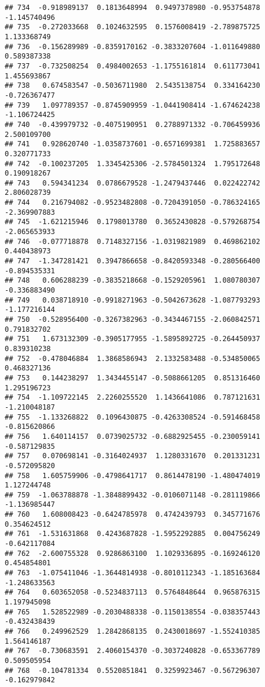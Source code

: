 \documentclass[
]{article}
\begin{document}
\begin{verbatim}
## 734  -0.918989137  0.1813648994  0.9497378980 -0.953754878 -1.145740496
## 735  -0.272033668  0.1024632595  0.1576008419 -2.789875725  1.133368749
## 736  -0.156289989 -0.8359170162 -0.3833207604 -1.011649880  0.589387338
## 737  -0.732508254  0.4984002653 -1.1755161814  0.611773041  1.455693867
## 738   0.674583547 -0.5036711980  2.5435138754  0.334164230 -0.726367477
## 739   1.097789357 -0.8745909959 -1.0441908414 -1.674624238 -1.106724425
## 740  -0.439979732 -0.4075190951  0.2788971332 -0.706459936  2.500109700
## 741   0.928620740 -1.0358737601 -0.6571699381  1.725883657  0.320771733
## 742  -0.100237205  1.3345425306 -2.5784501324  1.795172648  0.190918267
## 743   0.594341234  0.0786679528 -1.2479437446  0.022422742  2.806028739
## 744   0.216794082 -0.9523482808 -0.7204391050 -0.786324165 -2.369907883
## 745  -1.621215946  0.1798013780  0.3652430828 -0.579268754 -2.065653933
## 746  -0.077718878  0.7148327156 -1.0319821989  0.469862102  0.440438973
## 747  -1.347281421  0.3947866658 -0.8420593348 -0.280566400 -0.894535331
## 748   0.606288239 -0.3835218668 -0.1529205961  1.080780307 -0.336883490
## 749   0.038718910 -0.9918271963 -0.5042673628 -1.087793293 -1.177216144
## 750  -0.528956400 -0.3267382963 -0.3434467155 -2.060842571  0.791832702
## 751   1.673132309 -0.3905177955 -1.5895892725 -0.264450937  0.839310238
## 752  -0.478046884  1.3868586943  2.1332583488 -0.534850065  0.468327136
## 753   0.144238297  1.3434455147 -0.5088661205  0.851316460  1.295196723
## 754  -1.109722145  2.2260255520  1.1436641086  0.787121631 -1.210048187
## 755  -1.133268822  0.1096430875 -0.4263308524 -0.591468458 -0.815620866
## 756   1.640114157  0.0739025732 -0.6882925455 -0.230059141 -0.587129835
## 757   0.070698141 -0.3164024937  1.1280331670  0.201331231 -0.572095820
## 758   1.605759906 -0.4798641717  0.8614478190 -1.480474019  1.127244748
## 759  -1.063788878 -1.3848899432 -0.0106071148 -0.281119866 -1.136985447
## 760   1.608008423 -0.6424785978  0.4742439793  0.345771676  0.354624512
## 761  -1.531631868  0.4243687828 -1.5952292885  0.004756249 -0.642117084
## 762  -2.600755328  0.9286863100  1.1029336895 -0.169246120  0.454854801
## 763  -1.075411046 -1.3644814938 -0.8010112343 -1.185163684 -1.248633563
## 764   0.603652058 -0.5234837113  0.5764848644  0.965876315  1.197945098
## 765   1.528522989 -0.2030488338 -0.1150138554 -0.038357443 -0.432438439
## 766   0.249962529  1.2842868135  0.2430018697 -1.552410385  1.564146187
## 767  -0.730683591  2.4060154370 -0.3037240828 -0.653367789  0.509505954
## 768  -0.104781334  0.5520851841  0.3259923467 -0.567296307 -0.162979842

\end{verbatim}
\end{document}

